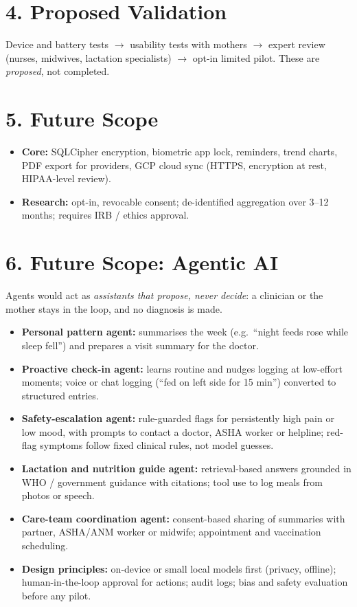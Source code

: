 \documentclass[10pt,a4paper]{article}
\begin{document}
\section{4. Proposed Validation}
Device and battery tests $\rightarrow$ usability tests with mothers $\rightarrow$ expert review (nurses, midwives, lactation specialists) $\rightarrow$ opt-in limited pilot. These are \emph{proposed}, not completed.

\section{5. Future Scope}
\begin{itemize}
  \item \textbf{Core:} SQLCipher encryption, biometric app lock, reminders, trend charts, PDF export for providers, GCP cloud sync (HTTPS, encryption at rest, HIPAA-level review).
  \item \textbf{Research:} opt-in, revocable consent; de-identified aggregation over 3--12 months; requires IRB / ethics approval.
\end{itemize}

\section{6. Future Scope: Agentic AI}
Agents would act as \emph{assistants that propose, never decide}: a clinician or the mother stays in the loop, and no diagnosis is made.
\begin{itemize}
  \item \textbf{Personal pattern agent:} summarises the week (e.g.\ ``night feeds rose while sleep fell'') and prepares a visit summary for the doctor.
  \item \textbf{Proactive check-in agent:} learns routine and nudges logging at low-effort moments; voice or chat logging (``fed on left side for 15 min'') converted to structured entries.
  \item \textbf{Safety-escalation agent:} rule-guarded flags for persistently high pain or low mood, with prompts to contact a doctor, ASHA worker or helpline; red-flag symptoms follow fixed clinical rules, not model guesses.
  \item \textbf{Lactation and nutrition guide agent:} retrieval-based answers grounded in WHO / government guidance with citations; tool use to log meals from photos or speech.
  \item \textbf{Care-team coordination agent:} consent-based sharing of summaries with partner, ASHA/ANM worker or midwife; appointment and vaccination scheduling.
  \item \textbf{Design principles:} on-device or small local models first (privacy, offline); human-in-the-loop approval for actions; audit logs; bias and safety evaluation before any pilot.
\end{itemize}
\end{document}
